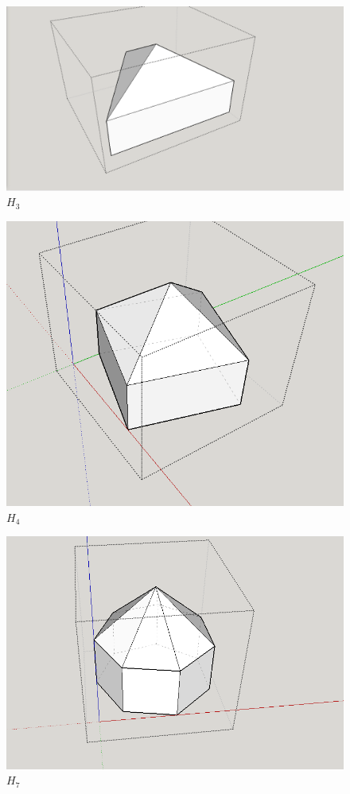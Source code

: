 \documentclass[12 pt]{article}
\begin{document}
\begin{figure}[h]
\caption{$H_3$}
\centering
\includegraphics[scale=0.15]{starUnfolding/h3.png}
\end{figure}
\begin{figure}[h]
\caption{$H_4$}
\centering
\includegraphics[scale=0.15]{starUnfolding/h4.png}
\end{figure}

\begin{figure}[h]
\caption{$H_7$}
\centering
\includegraphics[scale=0.15]{starUnfolding/h7.png}
\end{figure}
\end{document}
